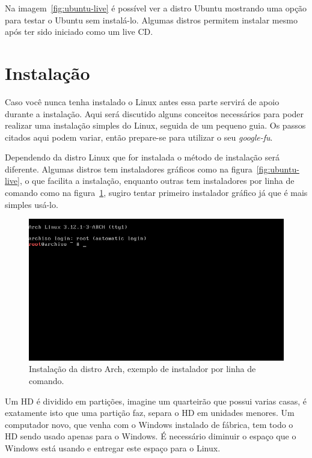 \documentclass{handout_utfpr}
\begin{document}
Na imagem~\ref{fig:ubuntu-live} é possível ver a distro Ubuntu mostrando uma opção para testar o Ubuntu sem instalá-lo. Algumas distros permitem instalar mesmo após ter sido iniciado como um live CD.

\section{Instalação}
Caso você nunca tenha instalado o Linux antes essa parte servirá de apoio durante a instalação. Aqui será discutido alguns conceitos necessários para poder realizar uma instalação simples do Linux, seguida de um pequeno guia. Os passos citados aqui podem variar, então prepare-se para utilizar o seu \emph{google-fu}.

Dependendo da distro Linux que for instalada o método de instalação será diferente. Algumas distros tem instaladores gráficos como na figura~\ref{fig:ubuntu-live}, o que facilita a instalação, enquanto outras tem instaladores por linha de comando como na figura~\ref{fig:arch-installer}, sugiro tentar primeiro instalador gráfico já que é mais simples usá-lo.

\begin{figure}[H]
    \centering
    \includegraphics[scale=.5]{imagens/arch-install-01.png}
    \caption{Instalação da distro Arch, exemplo de instalador por linha de comando.}
    \label{fig:arch-installer}
\end{figure}

Um HD é dividido em partições, imagine um quarteirão que possui varias casas, é exatamente isto que uma partição faz, separa o HD em unidades menores. Um computador novo, que venha com o Windows instalado de fábrica, tem todo o HD sendo usado apenas para o Windows. É necessário diminuir o espaço que o Windows está usando e entregar este espaço para o Linux.
\end{document}
